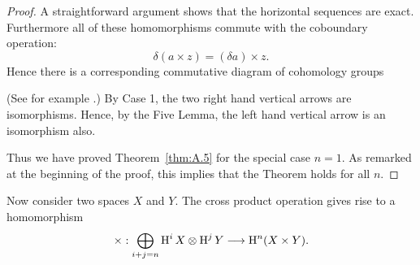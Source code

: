 \documentclass[../main]{subfiles}
\begin{document}
\begin{proof}
A straightforward argument shows that the horizontal sequences are exact. Furthermore all of these homomorphisms commute with the coboundary operation: \[\delta(a\times z) = (\delta a)\times z.\] Hence there is a corresponding commutative diagram of cohomology groups

\begin{center}
\end{center}

(See for example \cite[p. 182]{spanier1981}.) By Case 1, the two right hand vertical arrows are isomorphisms. Hence, by the Five Lemma, the left hand vertical arrow is an isomorphism also.

Thus we have proved Theorem~\ref{thm:A.5} for the special case $n=1$. As remarked at the beginning of the proof, this implies that the Theorem holds for all $n$.
\end{proof}

Now consider two spaces $X$ and $Y$. The cross product operation gives rise to a homomorphism \[\times: \displaystyle\bigoplus_{i+j=n} \homology^i X \otimes \homology^j Y \varrightarrow{} \homology^n (X\times Y).\] 
\end{document}
